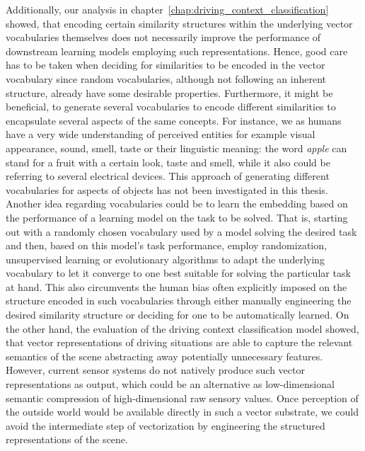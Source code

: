 Additionally, our analysis in chapter~\ref{chap:driving_context_classification} showed, that encoding certain similarity structures within the underlying vector vocabularies themselves does not necessarily improve the performance of downstream learning models employing such representations.
Hence, good care has to be taken when deciding for similarities to be encoded in the vector vocabulary since random vocabularies, although not following an inherent structure, already have some desirable properties.
Furthermore, it might be beneficial, to generate several vocabularies to encode different similarities to encapsulate several aspects of the same concepts.
For instance, we as humans have a very wide understanding of perceived entities for example visual appearance, sound, smell, taste or their linguistic meaning: the word \emph{apple} can stand for a fruit with a certain look, taste and smell, while it also could be referring to several electrical devices.
This approach of generating different vocabularies for aspects of objects has not been investigated in this thesis.
Another idea regarding vocabularies could be to learn the embedding based on the performance of a learning model on the task to be solved.
That is, starting out with a randomly chosen vocabulary used by a model solving the desired task and then, based on this model's task performance, employ randomization, unsupervised learning or evolutionary algorithms to adapt the underlying vocabulary to let it converge to one best suitable for solving the particular task at hand. 
This also circumvents the human bias often explicitly imposed on the structure encoded in such vocabularies through either manually engineering the desired similarity structure or deciding for one to be automatically learned.
On the other hand, the evaluation of the driving context classification model showed, that vector representations of driving situations are able to capture the relevant semantics of the scene abstracting away potentially unnecessary features.
However, current sensor systems do not natively produce such vector representations as output, which could be an alternative as low-dimensional semantic compression of high-dimensional raw sensory values.
Once perception of the outside world would be available directly in such a vector substrate, we could avoid the intermediate step of vectorization by engineering the structured representations of the scene.

